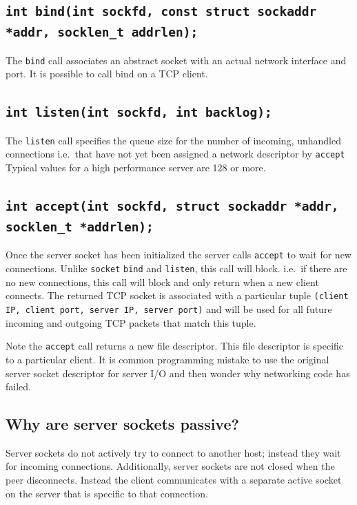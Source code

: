 \subsection{\texttt{int bind(int sockfd, const struct sockaddr *addr, socklen_t addrlen);}}

The \texttt{bind} call associates an abstract socket with an actual network interface and port. It is possible to call bind on a TCP client.

\subsection{\texttt{int listen(int sockfd, int backlog);}}

The \texttt{listen} call specifies the queue size for the number of incoming, unhandled connections i.e.~that have not yet been assigned a network descriptor by \texttt{accept} Typical values for a high performance server are 128 or more.

\subsection{\texttt{int accept(int sockfd, struct sockaddr *addr, socklen_t *addrlen);}}

Once the server socket has been initialized the server calls \texttt{accept} to wait for new connections. Unlike \texttt{socket} \texttt{bind} and \texttt{listen}, this call will block. i.e.~if there are no new connections, this call will block and only return when a new client connects. The returned TCP socket is associated with a particular tuple \texttt{(client IP, client port, server IP, server port)} and will be used for all future incoming and outgoing TCP packets that match this tuple.

Note the \texttt{accept} call returns a new file descriptor. This file descriptor is specific to a particular client. It is common programming mistake to use the original server socket descriptor for server I/O and then wonder why networking code has failed.

\subsection{Why are server sockets passive?}\label{why-are-server-sockets-passive}

Server sockets do not actively try to connect to another host; instead they wait for incoming connections. Additionally, server sockets are not closed when the peer disconnects. Instead the client communicates with a separate active socket on the server that is specific to that connection.

